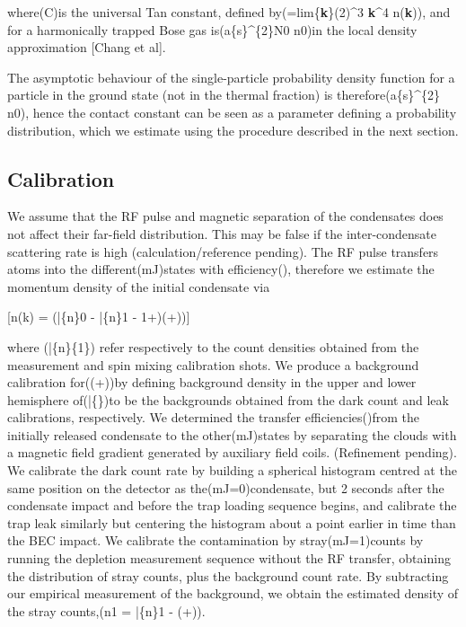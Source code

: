 where(C\infty)is the universal Tan constant, defined
by(=\textrm{lim}\{\textbar{}\textbf{k}\textbar{}\to\infty\}(2\pi)\^{}3
\textbar{}\textbf{k}\textbar\^{}4 n(\textbf{k})), and for a harmonically
trapped Bose gas is(a\{s\}\^{}\{2\}N0 n0)in the local
density approximation {[}Chang et al{]}.

The asymptotic behaviour of the single-particle probability density
function for a particle in the ground state (not in the thermal
fraction) is therefore(a\{s\}\^{}\{2\} n0), hence the
contact constant can be seen as a parameter defining a probability
distribution, which we estimate using the procedure described in the
next section.

\hypertarget{calibration}{%
\subsection{Calibration}\label{calibration}}

We assume that the RF pulse and magnetic separation of the condensates
does not affect their far-field distribution. This may be false if the
inter-condensate scattering rate is high (calculation/reference
pending). The RF pulse transfers atoms into the different(mJ)states with
efficiency(\etaJ), therefore we estimate the momentum density of the
initial condensate via

{[}n(k) = \left(\bar\{n\}0 - \bar\{n\}1 -
1+)(\delta+\lambda)\right){]}

where (\bar\{n\}\{1\}) refer respectively to the count densities
obtained from the measurement and spin mixing calibration shots. We
produce a background calibration for((\delta+\lambda))by defining
background density in the upper and lower hemisphere
of(\bar\{\delta\}\pm)to be the backgrounds obtained from the dark count
and leak calibrations, respectively. We determined the transfer
efficiencies(\etaJ)from the initially released condensate to the
other(mJ)states by separating the clouds with a magnetic field gradient
generated by auxiliary field coils. (Refinement pending). We calibrate
the dark count rate by building a spherical histogram centred at the
same position on the detector as the(mJ=0)condensate, but 2 seconds
after the condensate impact and before the trap loading sequence begins,
and calibrate the trap leak similarly but centering the histogram about
a point earlier in time than the BEC impact. We calibrate the
contamination by stray(mJ=1)counts by running the depletion measurement
sequence without the RF transfer, obtaining the distribution of stray
counts, plus the background count rate. By subtracting our empirical
measurement of the background, we obtain the estimated density of the
stray counts,(n1 = \bar\{n\}1 - (\delta+\lambda)).

